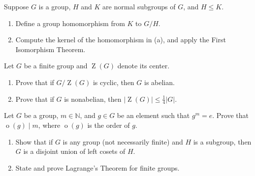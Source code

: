 \documentclass[11pt,twoside,openany]{memoir}
\begin{document}
            \begin{exercise}
            Suppose $G$ is a group, $H$ and $K$ are normal subgroups of $G$, and $H\le K$.
            \begin{enumerate}[label=(\alph*)]
                \item Define a group homomorphism from $K$ to $G/H$.
                \item Compute the kernel of the homomorphism in (a), and apply the First Isomorphism Theorem.
            \end{enumerate}
            \end{exercise}
            
            \begin{exercise}
            Let $G$ be a finite group and $\operatorname{Z}(G)$ denote its center.
            \begin{enumerate}[label=(\alph*)]
                \item Prove that if $G/\operatorname{Z}(G)$ is cyclic, then $G$ is abelian.
                \item Prove that if $G$ is nonabelian, then $|\operatorname{Z}(G)|\le \frac{1}{4}|G|$.
            \end{enumerate}
            \end{exercise}
            
            \begin{exercise}
            Let $G$ be a group, $m\in \mathbb{N}$, and $g\in G$ be an element such that $g^m=e$. Prove that $\operatorname{o}(g)\mid m$, where $\operatorname{o}(g)$ is the order of $g$.
            \end{exercise}
            
            \begin{exercise}
                \phantom{a}
            \begin{enumerate}[label=(\alph*)]
                \item Show that if $G$ is any group (not necessarily finite) and $H$ is a subgroup, then $G$ is a disjoint union of left cosets of $H$.
                \item State and prove Lagrange's Theorem for finite groups.
            \end{enumerate}
            \end{exercise}
            
\end{document}
